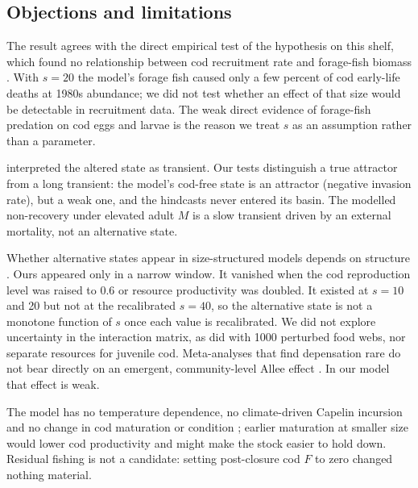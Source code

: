 \documentclass[12pt,letterpaper,fleqn]{article}
\begin{document}
\subsection{Objections and limitations}

The result agrees with the direct empirical test of the hypothesis on this shelf, which found no relationship between cod recruitment rate and forage-fish biomass \autocite{swain2012forage}. With $s=20$ the model's forage fish caused only a few percent of cod early-life deaths at 1980s abundance; we did not test whether an effect of that size would be detectable in recruitment data. The weak direct evidence of forage-fish predation on cod eggs and larvae \autocite{daan1985predation,garrison2000predation,neumann2017quantifying} is the reason we treat $s$ as an assumption rather than a parameter.

\textcite{frank2011transient} interpreted the altered state as transient. Our tests distinguish a true attractor from a long transient: the model's cod-free state is an attractor (negative invasion rate), but a weak one, and the hindcasts never entered its basin. The modelled non-recovery under elevated adult $M$ is a slow transient driven by an external mortality, not an alternative state.

Whether alternative states appear in size-structured models depends on structure \autocite{deroos2003influence,vanleeuwen2013predators,gardmark2015regime}. Ours appeared only in a narrow window. It vanished when the cod reproduction level was raised to 0.6 or resource productivity was doubled. It existed at $s=10$ and 20 but not at the recalibrated $s=40$, so the alternative state is not a monotone function of $s$ once each value is recalibrated. We did not explore uncertainty in the interaction matrix, as \textcite{adekoya2026reexamining} did with 1000 perturbed food webs, nor separate resources for juvenile cod. Meta-analyses that find depensation rare \autocite{myers1995population,hilborn2014dynamics} do not bear directly on an emergent, community-level Allee effect \autocite{deroos2002size}. In our model that effect is weak.

The model has no temperature dependence, no climate-driven Capelin incursion \autocite{frank1996recent} and no change in cod maturation or condition \autocite{olsen2004maturation,hutchings2005life,swain2011life}; earlier maturation at smaller size would lower cod productivity and might make the stock easier to hold down. Residual fishing is not a candidate: setting post-closure cod $F$ to zero changed nothing material.
\end{document}
